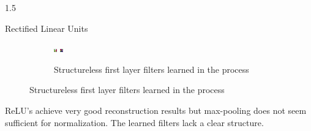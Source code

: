 \documentclass[final]{beamer}
\newlength{\onecolwid}
\begin{document}
\begin{frame}[t]
\begin{columns}[t]
\begin{column}{1.5\onecolwid}
\begin{alertblock}{Rectified Linear Units}
\begin{figure}
\begin{subfigure}{0.4\linewidth}
					\includegraphics[width=0.1\linewidth]{graphics/reconstructions/cifar/relu/relu_filter_07.png} \hspace{0.05\linewidth}
					\includegraphics[width=0.1\linewidth]{graphics/reconstructions/cifar/relu/relu_filter_08.png} 

					\caption{Structureless first layer filters learned in the process}

				\end{subfigure}


			\end{figure}

			ReLU's achieve very good reconstruction results but max-pooling does not seem sufficient for normalization. The learned filters lack a clear structure.

		\end{alertblock}

		\end{column}



\end{columns}



\end{frame} %
\end{document}
